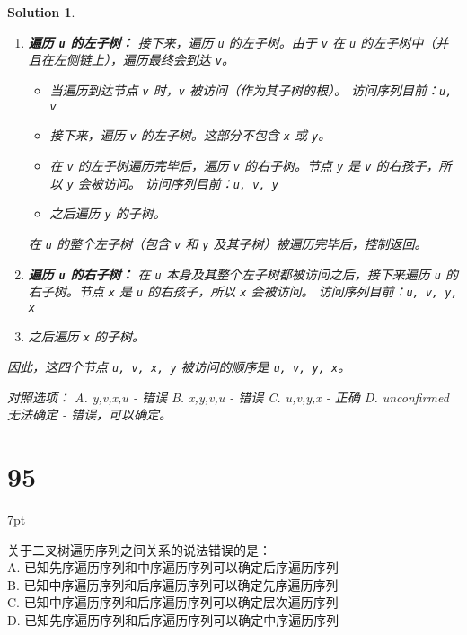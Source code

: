 \documentclass[UTF8]{report}
\newtheorem{solution}{Solution}
\theoremstyle{MyLineTheoremStyle} %
\theoremstyle{MyBlockTheoremStyle} %
\theoremstyle{MySubsubsectionStyle} %
\newenvironment{graybox}{%
        \def\FrameCommand{%
        \hspace{1pt}%
        {\color{gray}\small \vrule width 2pt}%
        {\color{graybox_color}\vrule width 4pt}%
        \colorbox{graybox_color}%
        }%
        \MakeFramed{\advance\hsize-\width\FrameRestore}%
        \noindent\hspace{-4.55pt}%
        \begin{adjustwidth}{}{7pt}%
        \vspace{2pt}\vspace{2pt}%
        }
        {%
        \vspace{2pt}\end{adjustwidth}\endMakeFramed%
        }
\begin{document}
\begin{solution}
\begin{enumerate}
    \item \textbf{遍历 \texttt{u} 的左子树：}
    接下来，遍历 \texttt{u} 的左子树。由于 \texttt{v} 在 \texttt{u} 的左子树中（并且在左侧链上），遍历最终会到达 \texttt{v}。
    \begin{itemize}
        \item 当遍历到达节点 \texttt{v} 时，\texttt{v} 被访问（作为其子树的根）。
        访问序列目前：\texttt{u, v}
        \item 接下来，遍历 \texttt{v} 的左子树。这部分不包含 \texttt{x} 或 \texttt{y}。
        \item 在 \texttt{v} 的左子树遍历完毕后，遍历 \texttt{v} 的右子树。节点 \texttt{y} 是 \texttt{v} 的右孩子，所以 \texttt{y} 会被访问。
        访问序列目前：\texttt{u, v, y}
        \item 之后遍历 \texttt{y} 的子树。
    \end{itemize}
    在 \texttt{u} 的整个左子树（包含 \texttt{v} 和 \texttt{y} 及其子树）被遍历完毕后，控制返回。

    \item \textbf{遍历 \texttt{u} 的右子树：}
    在 \texttt{u} 本身及其整个左子树都被访问之后，接下来遍历 \texttt{u} 的右子树。节点 \texttt{x} 是 \texttt{u} 的右孩子，所以 \texttt{x} 会被访问。
    访问序列目前：\texttt{u, v, y, x}
    \item 之后遍历 \texttt{x} 的子树。
\end{enumerate}

因此，这四个节点 \texttt{u, v, x, y} 被访问的顺序是 \texttt{u, v, y, x}。

对照选项：
A. y,v,x,u - 错误
B. x,y,v,u - 错误
C. u,v,y,x - 正确
D. unconfirmed无法确定 - 错误，可以确定。

\end{solution}



\section*{95}
\begin{graybox}
关于二叉树遍历序列之间关系的说法错误的是： \\
A. 已知先序遍历序列和中序遍历序列可以确定后序遍历序列 \\
B. 已知中序遍历序列和后序遍历序列可以确定先序遍历序列 \\
C. 已知中序遍历序列和后序遍历序列可以确定层次遍历序列 \\
D. 已知先序遍历序列和后序遍历序列可以确定中序遍历序列
\end{graybox}
\end{document}
